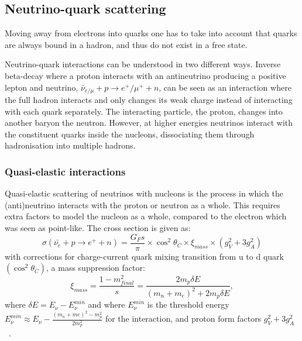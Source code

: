 \subsection{Neutrino-quark scattering}
Moving away from electrons into quarks one has to take into account that quarks are always bound in a hadron, and thus do not exist in a free state. 

Neutrino-quark interactions can be understood in two different ways. Inverse beta-decay where a proton interacts with an antineutrino producing a positive lepton and neutrino, $\bar{\nu}_{e/\mu} + p \rightarrow  e^+/\mu^+ + n$, can be seen as an interaction where the full hadron interacts and only changes its weak charge instead of interacting with each quark separately. The interacting particle, the proton, changes into another baryon the neutron. However, at higher energies neutrinos interact with the constituent quarks inside the nucleons, dissociating them through hadronisation into multiple hadrons.


\subsubsection{Quasi-elastic interactions}
Quasi-elastic scattering of neutrinos with nucleons is the process in which the (anti)neutrino interacts with the proton or neutron as a whole.
This requires extra factors to model the nucleon as a whole, compared to the electron which was seen as point-like. The cross section is given as:
\begin{equation}
\sigma(\bar{\nu_e} + p \rightarrow e^+ + n) = \frac{G_Fs}{\pi} \times \cos^2 \theta_C \times \xi_{mass} \times (g^2_V + 3 g^2_A)
\end{equation}
with corrections for charge-current quark mixing transition from u to d quark $( \cos^2 \theta_C)$, a mass suppression factor:
\begin{equation}
\xi_{mass}=\frac{1-m^2_{final}}{s} = \frac{2m_p \delta E}{(m_n+m_e)^2+2m_p \delta E},
\end{equation}  
where $\delta E = E_\nu - E_\nu^{min}$ and where $E_\nu ^{min}$ is the threshold energy $E_\nu ^{min} \approx E_\nu - \frac{(m_n+me)^2 - m_p^2}{2m_p^2}$  for the interaction, and proton form factors $g^2_V + 3 g^2_A$ ~\cite{47Soler}.

